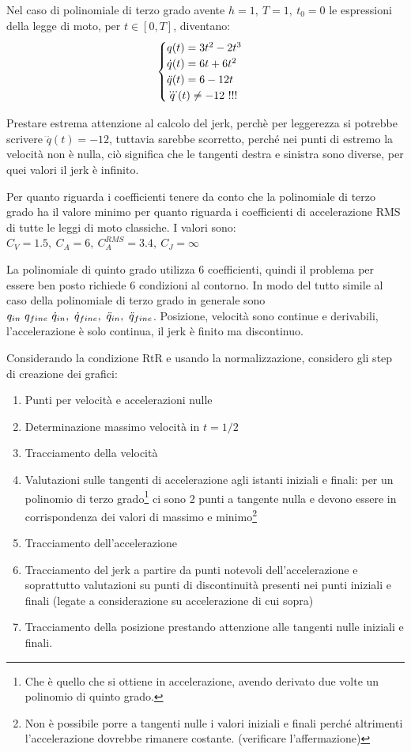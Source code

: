 Nel caso di polinomiale di terzo grado avente \(h=1, \ T=1, \ t_0=0\) le espressioni della legge di moto, per \(t\in[0,T]\), diventano:
\[\begin{cases}
    q(t) = 3 t^2 - 2 t^3 \\
    \dot{q}(t) = 6 t + 6 t^2 \\
    \Ddot{q}(t) = 6 - 12 t \\
    \dddot{q}(t) \neq -12 \ !!!
\end{cases}\]

Prestare estrema attenzione al calcolo del jerk, perchè per leggerezza si potrebbe scrivere \(\dddot{q}(t) = -12\), tuttavia sarebbe scorretto, perché nei punti di estremo la velocità non è nulla, ciò significa che le tangenti destra e sinistra sono diverse, per quei valori il jerk è infinito.

Per quanto riguarda i coefficienti tenere da conto che la polinomiale di terzo grado ha il valore minimo per quanto riguarda i coefficienti di accelerazione RMS di tutte le leggi di moto classiche. I valori sono: \(C_V=1.5, \ C_A = 6, \ C_A^{RMS}=3.4, \ C_J = \infty\)


La polinomiale di quinto grado utilizza 6 coefficienti, quindi il problema per essere ben posto richiede 6 condizioni al contorno. In modo del tutto simile al caso della polinomiale di terzo grado in generale sono \(q_{in} \ q_{fine} \ \dot{q}_{in}, \ \dot{q}_{fine}, \ \Ddot{q}_{in}, \ \Ddot{q}_{fine}\).
Posizione, velocità sono continue e derivabili, l'accelerazione è solo continua, il jerk è finito ma discontinuo.

Considerando la condizione RtR e usando la normalizzazione, considero gli step di creazione dei grafici:
\begin{enumerate}
    \item Punti per velocità e accelerazioni nulle
    \item Determinazione massimo velocità in \(t=1/2\)
    \item Tracciamento della velocità
    \item Valutazioni sulle tangenti di accelerazione agli istanti iniziali e finali: per un polinomio di terzo grado\footnote{Che è quello che si ottiene in accelerazione, avendo derivato due volte un polinomio di quinto grado.} ci sono 2 punti a tangente nulla e devono essere in corrispondenza dei valori di massimo e minimo\footnote{Non è possibile porre a tangenti nulle i valori iniziali e finali perché altrimenti l'accelerazione dovrebbe rimanere costante. {\color{red}(verificare l'affermazione)}}
    \item Tracciamento dell'accelerazione
    \item Tracciamento del jerk a partire da punti notevoli dell'accelerazione e soprattutto valutazioni su punti di discontinuità presenti nei punti iniziali e finali (legate a considerazione su accelerazione di cui sopra)
    \item Tracciamento della posizione prestando attenzione alle tangenti nulle iniziali e finali.
\end{enumerate}

